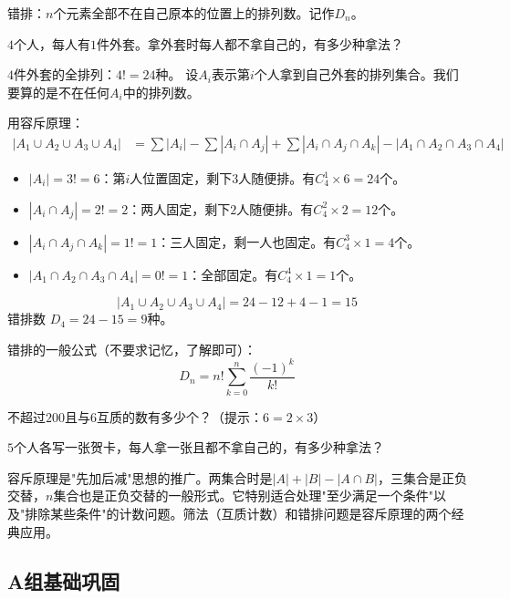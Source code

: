 错排：$n$个元素全部不在自己原本的位置上的排列数。记作$D_n$。

\begin{example}
$4$个人，每人有$1$件外套。拿外套时每人都不拿自己的，有多少种拿法？
\end{example}
\begin{solution}
$4$件外套的全排列：$4! = 24$种。
设$A_i$表示第$i$个人拿到自己外套的排列集合。我们要算的是不在任何$A_i$中的排列数。

用容斥原理：
\begin{align*}
|A_1\cup A_2\cup A_3\cup A_4| &= \sum|A_i| - \sum|A_i\cap A_j| + \sum|A_i\cap A_j\cap A_k| - |A_1\cap A_2\cap A_3\cap A_4|
\end{align*}
\begin{itemize}
\item $|A_i| = 3! = 6$：第$i$人位置固定，剩下$3$人随便排。有$C_4^1\times6 = 24$个。
\item $|A_i\cap A_j| = 2! = 2$：两人固定，剩下$2$人随便排。有$C_4^2\times2 = 12$个。
\item $|A_i\cap A_j\cap A_k| = 1! = 1$：三人固定，剩一人也固定。有$C_4^3\times1 = 4$个。
\item $|A_1\cap A_2\cap A_3\cap A_4| = 0! = 1$：全部固定。有$C_4^4\times1 = 1$个。
\end{itemize}
\[
|A_1\cup A_2\cup A_3\cup A_4| = 24 - 12 + 4 - 1 = 15
\]
错排数 $D_4 = 24 - 15 = 9$种。
\end{solution}

错排的一般公式（不要求记忆，了解即可）：
\[
D_n = n!\sum_{k=0}^n \frac{(-1)^k}{k!}
\]

\begin{exercise}
\item 不超过$200$且与$6$互质的数有多少个？（提示：$6=2\times3$）
\item $5$个人各写一张贺卡，每人拿一张且都不拿自己的，有多少种拿法？
\end{exercise}


容斥原理是"先加后减"思想的推广。两集合时是$|A|+|B|-|A\cap B|$，三集合是正负交替，$n$集合也是正负交替的一般形式。它特别适合处理"至少满足一个条件"以及"排除某些条件"的计数问题。筛法（互质计数）和错排问题是容斥原理的两个经典应用。


\subsection*{A组\quad 基础巩固}


